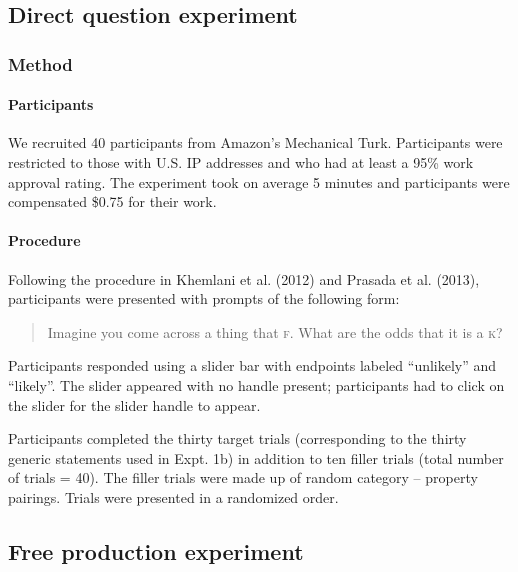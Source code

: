 \documentclass[english,floatsintext,man]{apa6}
\theoremstyle{definition}
\theoremstyle{definition}
\theoremstyle{definition}
\theoremstyle{remark}
\begin{document}
\subsection{Direct question
experiment}\label{direct-question-experiment}

\subsubsection{Method}\label{method-7}

\paragraph{Participants}\label{participants-7}

We recruited 40 participants from Amazon's Mechanical Turk. Participants
were restricted to those with U.S. IP addresses and who had at least a
95\% work approval rating. The experiment took on average 5 minutes and
participants were compensated \$0.75 for their work.

\paragraph{Procedure}\label{procedure-4}

Following the procedure in Khemlani et al. (2012) and Prasada et al.
(2013), participants were presented with prompts of the following form:

\begin{quotation}
Imagine you come across a thing that \textsc{f}.
What are the odds that it is a \textsc{k}?
\end{quotation}

Participants responded using a slider bar with endpoints labeled
\enquote{unlikely} and \enquote{likely}. The slider appeared with no
handle present; participants had to click on the slider for the slider
handle to appear.

Participants completed the thirty target trials (corresponding to the
thirty generic statements used in Expt. 1b) in addition to ten filler
trials (total number of trials = 40). The filler trials were made up of
random category -- property pairings. Trials were presented in a
randomized order.

\subsection{Free production
experiment}\label{free-production-experiment}
\end{document}
